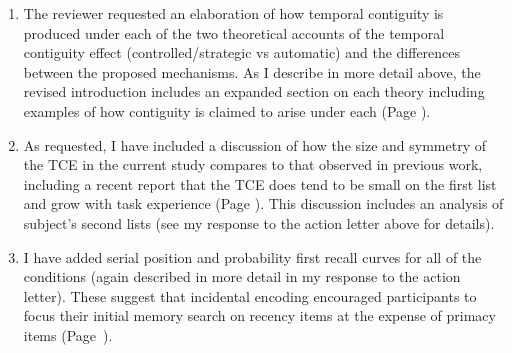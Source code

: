 \documentclass[12pt]{article}
\begin{document}
\begin{enumerate}

\item 
	The reviewer requested an elaboration of how temporal contiguity is produced under each of the two theoretical accounts of the temporal contiguity effect (controlled/strategic vs automatic) and the differences between the proposed mechanisms. As I describe in more detail above, the revised introduction includes an expanded section on each theory including examples of how contiguity is claimed to arise under each (Page \pageref{TODO-2}). 

\item
	As requested, I have included a discussion of how the size and symmetry of the TCE in the current study compares to that observed in previous work, including a recent report that the TCE does tend to be small on the first list and grow with task experience (Page \pageref{TODO-5}). This discussion includes an analysis of subject's second lists (see my response to the action letter above for details). 
	
\item
	I have added serial position and probability first recall curves for all of the conditions (again described in more detail in my response to the action letter). These suggest that incidental encoding encouraged participants to focus their initial memory search on recency items at the expense of primacy items (Page~\pageref{SPCtalk}).



\end{enumerate}
\end{document}
